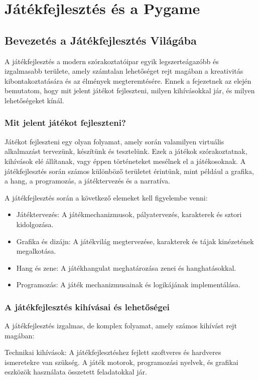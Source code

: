 \chapter{Játékfejlesztés és a Pygame}

\section{Bevezetés a Játékfejlesztés Világába}

A játékfejlesztés a modern szórakoztatóipar egyik legszerteágazóbb és izgalmasabb területe, amely számtalan lehetőséget rejt magában a kreativitás kibontakoztatására és az élmények megteremtésére. Ennek a fejezetnek az elején bemutatom, hogy mit jelent játékot fejleszteni, milyen kihívásokkal jár, és milyen lehetőségeket kínál.

\subsection{Mit jelent játékot fejleszteni?}
Játékot fejleszteni egy olyan folyamat, amely során valamilyen virtuális alkalmazást tervezünk, készítünk és tesztelünk. Ezek a játékok szórakoztatnak, kihívások elé állítanak, vagy éppen történeteket mesélnek el a játékosoknak. A játékfejlesztés során számos különböző területet érintünk, mint például a grafika, a hang, a programozás, a játéktervezés és a narratíva.

A játékfejlesztés során a következő elemeket kell figyelembe venni:

\begin{itemize}
    
    \item Játéktervezés: A játékmechanizmusok, pályatervezés, karakterek és sztori kidolgozása.
    \item Grafika és dizájn: A játékvilág megtervezése, karakterek és tájak kinézetének megalkotása.
    \item Hang és zene: A játékhangulat meghatározása zenei és hanghatásokkal.
    \item Programozás: A játék mechanizmusainak és logikájának implementálása.
\end{itemize}
\subsection{A játékfejlesztés kihívásai és lehetőségei}
A játékfejlesztés izgalmas, de komplex folyamat, amely számos kihívást rejt magában:

Technikai kihívások: A játékfejlesztéshez fejlett szoftveres és hardveres ismeretekre van szükség. A játék motorok, programozási nyelvek, és grafikai eszközök használata összetett feladatokkal jár.

